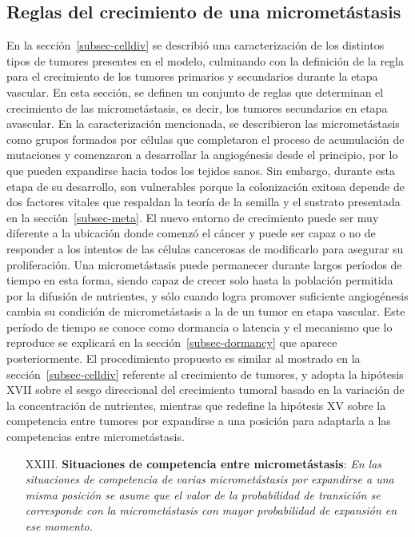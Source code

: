 \subsection{Reglas del crecimiento de una micromet\'astasis}
\label{subsec-micrometastasis}
En la sección~\ref{subsec-celldiv} se describió una caracterización de los distintos tipos de tumores presentes en el modelo, culminando con la definición de la regla para el crecimiento de los tumores primarios y secundarios durante la etapa vascular. En esta sección, se definen un conjunto de reglas que determinan el crecimiento de las micrometástasis, es decir, los tumores secundarios en etapa avascular. En la caracterización mencionada, se describieron las micrometástasis como grupos formados por células que completaron el proceso de acumulación de mutaciones y comenzaron a desarrollar la angiogénesis desde el principio, por lo que pueden expandirse hacia todos los tejidos sanos. Sin embargo, durante esta etapa de su desarrollo, son vulnerables porque la colonización exitosa depende de dos factores vitales que respaldan la teoría de la semilla y el sustrato presentada en la sección~\ref{subsec-meta}. El nuevo entorno de crecimiento puede ser muy diferente a la ubicación donde comenzó el cáncer y puede ser capaz o no de responder a los intentos de las células cancerosas de modificarlo para asegurar su proliferación. Una micrometástasis puede permanecer durante largos períodos de tiempo en esta forma, siendo capaz de crecer solo hasta la población permitida por la difusión de nutrientes, y sólo cuando logra promover suficiente angiogénesis cambia su condición de micrometástasis a la de un tumor en etapa vascular. Este período de tiempo se conoce como dormancia o latencia y el mecanismo que lo reproduce se explicará en la sección~\ref{subsec-dormancy} que aparece posteriormente. El procedimiento propuesto es similar al mostrado en la sección~\ref{subsec-celldiv} referente al crecimiento de tumores, y adopta la hipótesis XVII sobre el sesgo direccional del crecimiento tumoral basado en la variación de la concentración de nutrientes, mientras que redefine la hipótesis XV sobre la competencia entre tumores por expandirse a una posición para adaptarla a las competencias entre micrometástasis.

\begin{itemize}
\item [{XXIII.}] \textbf{Situaciones de competencia entre micromet\'astasis}: \emph{En las situaciones de competencia de varias micromet\'astasis por expandirse a una misma posici\'on se asume que el valor de la probabilidad de transici\'on se corresponde con la micromet\'astasis con mayor probabilidad de expansi\'on en ese momento.} \label{XXIII}
\end{itemize}

